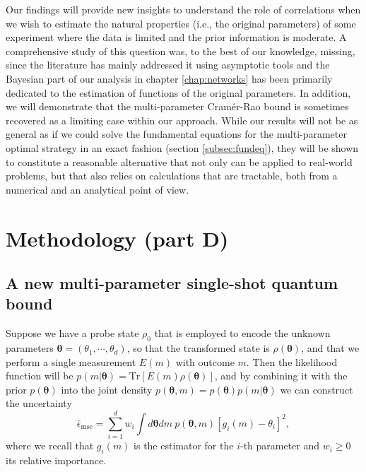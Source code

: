 Our findings will provide new insights to understand the role of correlations when we wish to estimate the natural properties (i.e., the original parameters) of some experiment where the data is limited and the prior information is moderate. A comprehensive study of this question was, to the best of our knowledge, missing, since the literature has mainly addressed it using asymptotic tools \cite{proctor2017networked, proctor2017networkedshort, knott2016local, altenburg2018} and the Bayesian part of our analysis in chapter \ref{chap:networks} has been primarily dedicated to the estimation of functions of the original parameters. In addition, we will demonstrate that the multi-parameter Cram\'{e}r-Rao bound is sometimes recovered as a limiting case within our approach. While our results will not be as general as if we could solve the fundamental equations for the multi-parameter optimal strategy in an exact fashion (section \ref{subsec:fundeq}), they will be shown to constitute a reasonable alternative that not only can be applied to real-world problems, but that also relies on calculations that are tractable, both from a numerical and an analytical point of view.

\section{Methodology (part D)}

\subsection{A new multi-parameter single-shot quantum bound}
\label{subsec:mybound}

Suppose we have a probe state $\rho_0$ that is employed to encode the unknown parameters $\boldsymbol{\theta} = (\theta_1, \cdots, \theta_d)$, so that the transformed state is $\rho(\boldsymbol{\theta})$, and that we perform a single measurement $E(m)$ with outcome $m$. Then the likelihood function will be $p(m|\boldsymbol{\theta}) = \mathrm{Tr}[E(m) \rho(\boldsymbol{\theta})]$, and by combining it with the prior $p(\boldsymbol{\theta})$ into the joint density $p(\boldsymbol{\theta}, m) = p(\boldsymbol{\theta}) p(m|\boldsymbol{\theta})$ we can construct the uncertainty
\begin{equation}
\bar{\epsilon}_{\mathrm{mse}} = \sum_{i=1}^d w_i \int d\boldsymbol{\theta} dm ~p(\boldsymbol{\theta}, m) \left[g_i(m) - \theta_i  \right]^2,
\label{msegen}
\end{equation}
where we recall that $g_i(m)$ is the estimator for the $i$-th parameter and $w_i \geqslant 0$ its relative importance. 


